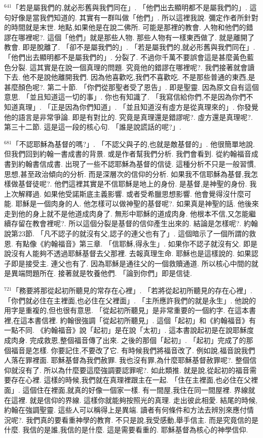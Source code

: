 \documentclass{book}
\begin{document}
$^{641}$「若是屬我們的,就必形舊與我們同在」.
「他們出去顯明都不是屬我們的」.
這句好像是當我們知道的.
其實有一群叫做「他們」.
所以這裡我說.
彌定作者所針對的時間就是末世.
地點,如果他是在說二佛所.
可能是那裡的教會.
人物和他們的錯謬在哪裡呢?.
這個「他們」就是那些人物.
那些人物有一樣東西做了.
就是離開了教會.
即是脫離了.
「卻不是屬我們的」.
「若是屬我們的,就必形舊與我們同在」.
「他們出去顯明都不是屬我們的」.
分裂了.
不過你千萬不要誤會這是甚麼黃色藍色分裂.
這其實是在說一個真理的問題.
究竟他的錯謬在哪裡呢?.
我們接著就會讀下去.
他不是說他離開我們.
因為他喜歡吃,我們不喜歡吃.
不是那些普通的東西,是甚麼顏色呢?.
第二十節.
「你們從那聖者受了恩告」.
即是聖靈.
因為原文自有這個意思.
「並且知道這一切的事」.
你也有知識了.
「我寫信給你們,不是因為你們不知道真理」.
「正是因為你們知道」.
「並且知道沒有虛方是從真理來的」.
你發覺他的語言是非常爭論.
即是有對比的.
究竟是真理還是錯謬呢?.
虛方還是真理呢?.
第三十二節.
這是這一段的核心句.
「誰是說謊話的呢?」.

$^{681}$「不認耶穌為基督的嗎?」.
「不認父與子的,也就是敵基督的」.
他很簡單地說.
但我們回到約翰一書成書的背景.
或是作者幫我們分析.
我們會看到.
從約翰福音成書到約翰書信成書.
出現了一些不認耶穌為基督的信徒.
這種分析不只是一般習慣,思想,甚至政治傾向的分析.
而是深層次的信仰的分析.
如果我不信耶穌為基督,我怎樣做基督徒呢?.
他們這裡其實是不信耶穌是地上的身份.
是基督,是神聖的身份.
我上次解釋過.
如果他受諾斯底主義影響.
或者受希臘思想影響.
他會覺得沒什麼可能.
耶穌是一個肉身的人.
他怎樣可以做神聖的基督呢?.
如果真是神聖的話.
他後來走到他的身上就不是他道成肉身了.
無形中耶穌的道成肉身.
他根本不信,又怎能繼續存留在教會裡呢?.
所以這個分裂是基督的信仰產生出來的.
結論是怎樣呢?.
約翰說第23節.
「凡不認子的就沒有父,認子的連父也有了」.
這個暗示了一個所謂的救恩.
有點像《約翰福音》第三章.
「信耶穌,得永生」.
如果你不認子就沒有父.
即是說沒有人能夠不透過耶穌基督去父那裡.
去報真理生命.
耶穌也是這樣說的.
如果認子即是接受主.
連父也有了.
因為耶穌是通往父的一個救贖通道.
所以核心中間的就是異端問題所在.
接著就是牧養他們.
「論到你們」即是信徒.

$^{721}$「務要將那從起初所聽見的常存在心裡」.
「若將從起初所聽見的存在心裡」.
「你們就必住在主裡面,也必住在父裡面」.
「主所應許我們的就是永生」.
他說的用字是重複的,但也很有意思.
「從起初所聽見」是非常重要的一個約字.
在這本書裡,在這本書信裡.
約翰很強調「從起初所聽見」.
這個「起初」和《約翰福音》有一點不同.
《約翰福音》說「起初」是在說「太初」.
這本書說起初是在說耶穌度成肉身.
完成救恩,整個福音傳了出來.
之後的那個「起初」.
「起初」完成了的那個福音是怎樣.
你要記住,不要改了它.
有時候我們將福音改了.
例如說,福音說我們人落在罪裡面.
耶穌基督為我們赦罪.
我也沒有罪,為什麼耶穌基督赦罪呢?.
整個信仰就沒有了.
所以為什麼要這麼強調要認罪呢?.
如此類推.
就是說,從起初的福音需要存在心裡.
這樣的時候,我們就在真理裡跟主在一起.
「住在主裡面,也必住在父裡面」.
這個住在裡面,就真的好像一個家一樣.
有一間屋,我住在同一間屋裡.
界線就在這裡.
就是信仰的界線.
這樣你就能夠按照光的真理.
走出彼此相愛.
結尾的時候,約翰在強調聖靈.
這些人可以稱得上是異端.
讀者有何條件和方法去辨別來應付情況呢?.
我們真的要看重神學的教育.
不只是說,我受感動,舉手信主.
而是究竟信的是什麼.
我信的是誰,我信的是什麼.
這是需要看重的.
耶穌基督為核心的神學信仰.
\end{document}
